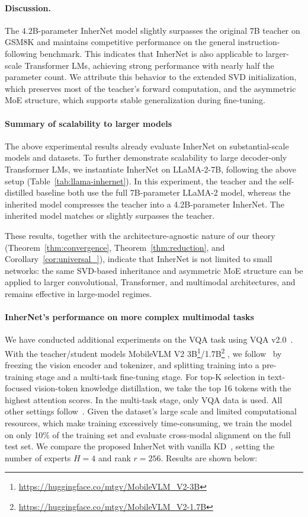 \documentclass{article} %
\begin{document}
\paragraph{Discussion.}
The $4.2$B-parameter InherNet model slightly surpasses the original $7$B teacher on GSM8K and maintains competitive performance on the general instruction-following benchmark. This indicates that InherNet is also applicable to larger-scale Transformer LMs, achieving strong performance with nearly half the parameter count. We attribute this behavior to the extended SVD initialization, which preserves most of the teacher's forward computation, and the asymmetric MoE structure, which supports stable generalization during fine-tuning.

\paragraph{Summary of scalability to larger models}

The above experimental results already evaluate InherNet on substantial-scale models and datasets. To further demonstrate scalability to large decoder-only Transformer LMs, we instantiate InherNet on LLaMA-2-7B, following the above setup (Table~\ref{tab:llama-inhernet}). In this experiment, the teacher and the self-distilled baseline both use the full 7B-parameter LLaMA-2 model, whereas the inherited model compresses the teacher into a 4.2B-parameter InherNet. The inherited model matches or slightly surpasses the teacher. 

These results, together with the architecture-agnostic nature of our theory (Theorem~\ref{thm:convergence}, Theorem~\ref{thm:reduction}, and Corollary~\ref{cor:universal_}), indicate that InherNet is not limited to small networks: the same SVD-based inheritance and asymmetric MoE structure can be applied to larger convolutional, Transformer, and multimodal architectures, and remains effective in large-model regimes.

\paragraph{InherNet's performance on more complex multimodal tasks} We have conducted additional experiments on the VQA task using VQA v2.0~\cite{goyal2017making}. With the teacher/student models MobileVLM V2 3B\footnote{\url{https://huggingface.co/mtgv/MobileVLM_V2-3B}}/1.7B\footnote{\url{https://huggingface.co/mtgv/MobileVLM_V2-1.7B}} \cite{chu2024mobilevlm}, we follow~\cite{chu2024mobilevlm} by freezing the vision encoder and tokenizer, and splitting training into a pre-training stage and a multi-task fine-tuning stage. For top-K selection in text-focused vision-token knowledge distillation, we take the top 16 tokens with the highest attention scores. In the multi-task stage, only VQA data is used. All other settings follow~\cite{chu2024mobilevlm}. Given the dataset's large scale and limited computational resources, which make training excessively time-consuming, we train the model on only 10\% of the training set and evaluate cross-modal alignment on the full test set. We compare the proposed InherNet with vanilla KD~\cite{hinton2015distilling}, setting the number of experts $H=4$ and rank $r=256$. Results are shown below:
\end{document}
